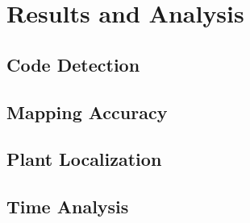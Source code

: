 
\cleardoublepage

\chapter{Results and Analysis}
\label{processing}

\section{Code Detection}


\section{Mapping Accuracy}


\section{Plant Localization}


\section{Time Analysis}
